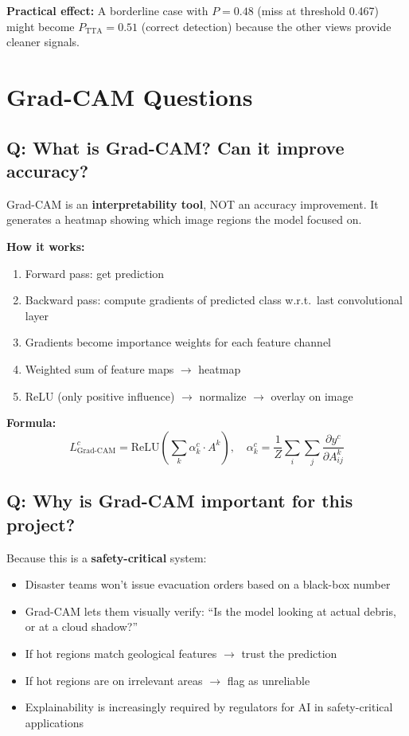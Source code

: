\documentclass[11pt]{article}
\begin{document}
\textbf{Practical effect:} A borderline case with $P = 0.48$ (miss at threshold 0.467) might become $P_{\text{TTA}} = 0.51$ (correct detection) because the other views provide cleaner signals.

\section{Grad-CAM Questions}

\subsection{Q: What is Grad-CAM? Can it improve accuracy?}

Grad-CAM is an \textbf{interpretability tool}, NOT an accuracy improvement. It generates a heatmap showing which image regions the model focused on.

\textbf{How it works:}
\begin{enumerate}[noitemsep]
    \item Forward pass: get prediction
    \item Backward pass: compute gradients of predicted class w.r.t.\ last convolutional layer
    \item Gradients become importance weights for each feature channel
    \item Weighted sum of feature maps $\to$ heatmap
    \item ReLU (only positive influence) $\to$ normalize $\to$ overlay on image
\end{enumerate}

\textbf{Formula:}
\[
L_{\text{Grad-CAM}}^{c} = \text{ReLU}\!\left(\sum_k \alpha_k^c \cdot A^k\right), \quad \alpha_k^c = \frac{1}{Z} \sum_i \sum_j \frac{\partial y^c}{\partial A^k_{ij}}
\]

\subsection{Q: Why is Grad-CAM important for this project?}

Because this is a \textbf{safety-critical} system:
\begin{itemize}[noitemsep]
    \item Disaster teams won't issue evacuation orders based on a black-box number
    \item Grad-CAM lets them visually verify: ``Is the model looking at actual debris, or at a cloud shadow?''
    \item If hot regions match geological features $\to$ trust the prediction
    \item If hot regions are on irrelevant areas $\to$ flag as unreliable
    \item Explainability is increasingly required by regulators for AI in safety-critical applications
\end{itemize}
\end{document}
